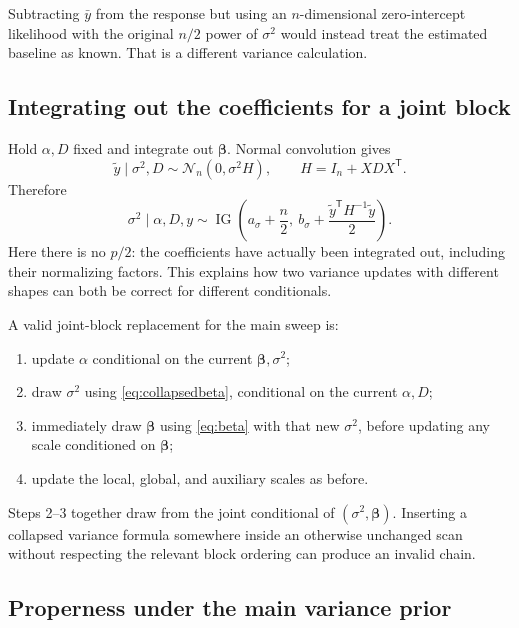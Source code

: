 \documentclass[11pt,letterpaper]{article}
\numberwithin{equation}{section}
\newcommand{\IG}{\operatorname{IG}}
\newcommand{\Normal}{\mathcal{N}}
\newcommand{\given}{\mid}
\newcommand{\bbeta}{\bm{\beta}}
\newcommand{\trans}{^{\mathsf T}}
\begin{document}
Subtracting \(\bar y\) from the response but using an \(n\)-dimensional
zero-intercept likelihood with the original \(n/2\) power of \(\sigma^2\)
would instead treat the estimated baseline as known. That is a different
variance calculation.

\subsection{Integrating out the coefficients for a joint block}

Hold \(\alpha,D\) fixed and integrate out \(\bbeta\). Normal convolution
gives
\begin{equation}
 \widetilde y\given\sigma^2,D\sim\Normal_n(0,\sigma^2H),
 \qquad H=I_n+XDX\trans.
\end{equation}
Therefore
\begin{equation}\label{eq:collapsedbeta}
 \sigma^2\given\alpha,D,y\sim
 \IG\left(a_\sigma+\frac n2,\ b_\sigma+
          \frac{\widetilde y\trans H^{-1}\widetilde y}{2}\right).
\end{equation}
Here there is no \(p/2\): the coefficients have actually been integrated
out, including their normalizing factors. This explains how two variance
updates with different shapes can both be correct for different conditionals.

A valid joint-block replacement for the main sweep is:
\begin{enumerate}
\item update \(\alpha\) conditional on the current \(\bbeta,\sigma^2\);
\item draw \(\sigma^2\) using \eqref{eq:collapsedbeta}, conditional on the
      current \(\alpha,D\);
\item immediately draw \(\bbeta\) using \eqref{eq:beta} with that new
      \(\sigma^2\), before updating any scale conditioned on \(\bbeta\);
\item update the local, global, and auxiliary scales as before.
\end{enumerate}
Steps 2--3 together draw from the joint conditional of
\((\sigma^2,\bbeta)\). Inserting a collapsed variance formula somewhere
inside an otherwise unchanged scan without respecting the relevant block
ordering can produce an invalid chain.

\subsection{Properness under the main variance prior}
\end{document}
